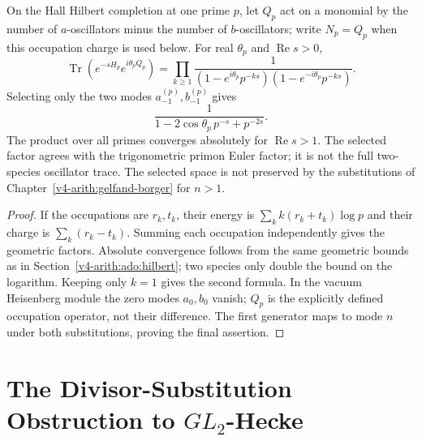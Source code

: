 \begin{proposition}
\label{v4-arith:prop:character-match-naive}
On the Hall Hilbert completion at one prime \(p\), let \(Q_p\) act on a monomial by the number of
\(a\)-oscillators minus the number of \(b\)-oscillators; write
\(N_p=Q_p\) when this occupation charge is used below. For real
\(\theta_p\) and \(\operatorname{Re}s>0\),
\[
 \operatorname{Tr}(e^{-sH_p}e^{i\theta_pQ_p})
 =\prod_{k\ge1}
 \frac1{(1-e^{i\theta_p}p^{-ks})(1-e^{-i\theta_p}p^{-ks})}.
\]
Selecting only the two modes \(a_{-1}^{(p)},b_{-1}^{(p)}\) gives
\[
 \frac1{1-2\cos\theta_p\,p^{-s}+p^{-2s}}.
\]
The product over all primes converges absolutely for
\(\operatorname{Re}s>1\). The selected factor agrees with the
trigonometric primon Euler factor; it is not the full two-species
oscillator trace. The selected space is not preserved by the
substitutions of Chapter~\ref{v4-arith:gelfand-borger} for \(n>1\).
\end{proposition}
\begin{proof}
If the occupations are \(r_k,t_k\), their energy is
\(\sum_k k(r_k+t_k)\log p\) and their charge is
\(\sum_k(r_k-t_k)\). Summing each occupation independently gives the
geometric factors. Absolute convergence follows from the same geometric
bounds as in Section~\ref{v4-arith:ado:hilbert}; two species only double the
bound on the logarithm. Keeping only \(k=1\) gives the second formula.
In the vacuum Heisenberg module the zero modes \(a_0,b_0\) vanish;
\(Q_p\) is the explicitly defined occupation operator, not their
difference. The first generator maps to mode \(n\) under both
substitutions, proving the final assertion.
\end{proof}

\section{The Divisor-Substitution Obstruction to \(GL_2\)-Hecke}
\label{v4-arith:construction:hecke-adams-naive}

